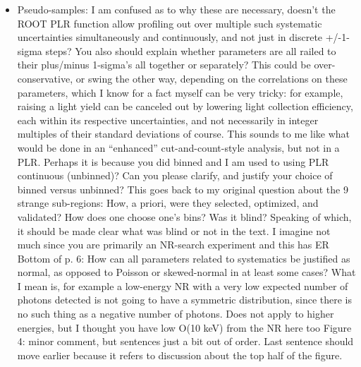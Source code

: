 \documentclass{article}
\begin{document}
\begin{itemize}
	\item {\color{blue} Pseudo-samples: I am confused as to why these are necessary, doesn’t
the ROOT PLR function allow profiling out over multiple such
systematic uncertainties simultaneously and continuously, and not just
in discrete +/-1-sigma steps? You also should explain whether
parameters are all railed to their plus/minus 1-sigma’s all together
or separately? This could be over-conservative, or swing the other
way, depending on the correlations on these parameters, which I know
for a fact myself can be very tricky: for example, raising a light
yield can be canceled out by lowering light collection efficiency,
each within its respective uncertainties, and not necessarily in
integer multiples of their standard deviations of course. This sounds
to me like what would be done in an “enhanced” cut-and-count-style
analysis, but not in a PLR. Perhaps it is because you did binned and I
am used to using PLR continuous (unbinned)? Can you please clarify,
and justify your choice of binned versus unbinned? This goes back to
my original question about the 9 strange sub-regions: How, a priori,
were they selected, optimized, and validated? How does one choose
one’s bins? Was it blind? Speaking of which, it should be made clear
what was blind or not in the text. I imagine not much since you are
primarily an NR-search experiment and this has ER Bottom of p. 6: How
can all parameters related to systematics be justified as normal, as
opposed to Poisson or skewed-normal in at least some cases? What I
mean is, for example a low-energy NR with a very low expected number
of photons detected is not going to have a symmetric distribution,
since there is no such thing as a negative number of photons. Does not
apply to higher energies, but I thought you have low O(10 keV) from
the NR here too Figure 4: minor comment, but sentences just a bit out
of order. Last sentence should move earlier because it refers to
discussion about the top half of the figure.}
\end{itemize}
\end{document}
